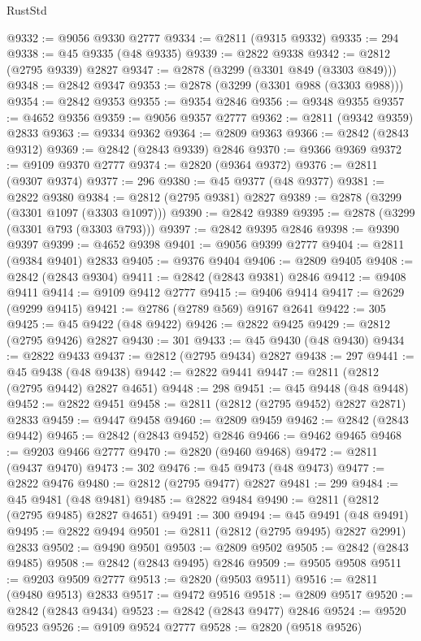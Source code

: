 \begin{lexlean}{RustStd}
\begin{coremodule}
@9332 := @9056 @9330 @2777
@9334 := @2811 (@9315 @9332)
@9335 := 294
@9338 := @45 @9335 (@48 @9335)
@9339 := @2822 @9338
@9342 := @2812 (@2795 @9339) @2827
@9347 := @2878 (@3299 (@3301 @849 (@3303 @849)))
@9348 := @2842 @9347
@9353 := @2878 (@3299 (@3301 @988 (@3303 @988)))
@9354 := @2842 @9353
@9355 := @9354 @2846
@9356 := @9348 @9355
@9357 := @4652 @9356
@9359 := @9056 @9357 @2777
@9362 := @2811 (@9342 @9359) @2833
@9363 := @9334 @9362
@9364 := @2809 @9363
@9366 := @2842 (@2843 @9312)
@9369 := @2842 (@2843 @9339) @2846
@9370 := @9366 @9369
@9372 := @9109 @9370 @2777
@9374 := @2820 (@9364 @9372)
@9376 := @2811 (@9307 @9374)
@9377 := 296
@9380 := @45 @9377 (@48 @9377)
@9381 := @2822 @9380
@9384 := @2812 (@2795 @9381) @2827
@9389 := @2878 (@3299 (@3301 @1097 (@3303 @1097)))
@9390 := @2842 @9389
@9395 := @2878 (@3299 (@3301 @793 (@3303 @793)))
@9397 := @2842 @9395 @2846
@9398 := @9390 @9397
@9399 := @4652 @9398
@9401 := @9056 @9399 @2777
@9404 := @2811 (@9384 @9401) @2833
@9405 := @9376 @9404
@9406 := @2809 @9405
@9408 := @2842 (@2843 @9304)
@9411 := @2842 (@2843 @9381) @2846
@9412 := @9408 @9411
@9414 := @9109 @9412 @2777
@9415 := @9406 @9414
@9417 := @2629 (@9299 @9415)
@9421 := @2786 (@2789 @569) @9167 @2641
@9422 := 305
@9425 := @45 @9422 (@48 @9422)
@9426 := @2822 @9425
@9429 := @2812 (@2795 @9426) @2827
@9430 := 301
@9433 := @45 @9430 (@48 @9430)
@9434 := @2822 @9433
@9437 := @2812 (@2795 @9434) @2827
@9438 := 297
@9441 := @45 @9438 (@48 @9438)
@9442 := @2822 @9441
@9447 := @2811 (@2812 (@2795 @9442) @2827 @4651)
@9448 := 298
@9451 := @45 @9448 (@48 @9448)
@9452 := @2822 @9451
@9458 := @2811 (@2812 (@2795 @9452) @2827 @2871) @2833
@9459 := @9447 @9458
@9460 := @2809 @9459
@9462 := @2842 (@2843 @9442)
@9465 := @2842 (@2843 @9452) @2846
@9466 := @9462 @9465
@9468 := @9203 @9466 @2777
@9470 := @2820 (@9460 @9468)
@9472 := @2811 (@9437 @9470)
@9473 := 302
@9476 := @45 @9473 (@48 @9473)
@9477 := @2822 @9476
@9480 := @2812 (@2795 @9477) @2827
@9481 := 299
@9484 := @45 @9481 (@48 @9481)
@9485 := @2822 @9484
@9490 := @2811 (@2812 (@2795 @9485) @2827 @4651)
@9491 := 300
@9494 := @45 @9491 (@48 @9491)
@9495 := @2822 @9494
@9501 := @2811 (@2812 (@2795 @9495) @2827 @2991) @2833
@9502 := @9490 @9501
@9503 := @2809 @9502
@9505 := @2842 (@2843 @9485)
@9508 := @2842 (@2843 @9495) @2846
@9509 := @9505 @9508
@9511 := @9203 @9509 @2777
@9513 := @2820 (@9503 @9511)
@9516 := @2811 (@9480 @9513) @2833
@9517 := @9472 @9516
@9518 := @2809 @9517
@9520 := @2842 (@2843 @9434)
@9523 := @2842 (@2843 @9477) @2846
@9524 := @9520 @9523
@9526 := @9109 @9524 @2777
@9528 := @2820 (@9518 @9526)

\end{coremodule}
\end{lexlean}
